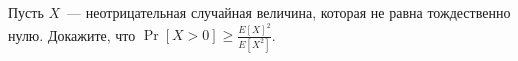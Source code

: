 Пусть $X$~--- неотрицательная случайная величина, которая не равна тождественно нулю. Докажите, что $\Pr[X > 0] \ge \frac{E[X]^2}{E[X^2]}$.